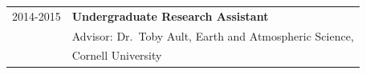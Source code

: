 \documentclass[margin,line,palatino,courier,10pt]{res}
\begin{document}
\begin{resume}
\begin{tabular}{@{}p{0.9in}p{4in}}
2014-2015 & \textbf{Undergraduate Research Assistant}\\
& \hspace{0.2in} Advisor: Dr.\ Toby Ault, Earth and Atmospheric Science, \\
& \vspace{-0.18in}\hspace{0.2in} Cornell University\\
\end{tabular}

\vspace{-0.1in}
\noindent\textcolor{MidnightBlue}{\makebox[\linewidth][r]{\rule{\textwidth}{5pt}}}
\vspace{-0.3in}


\end{resume}
\end{document}
